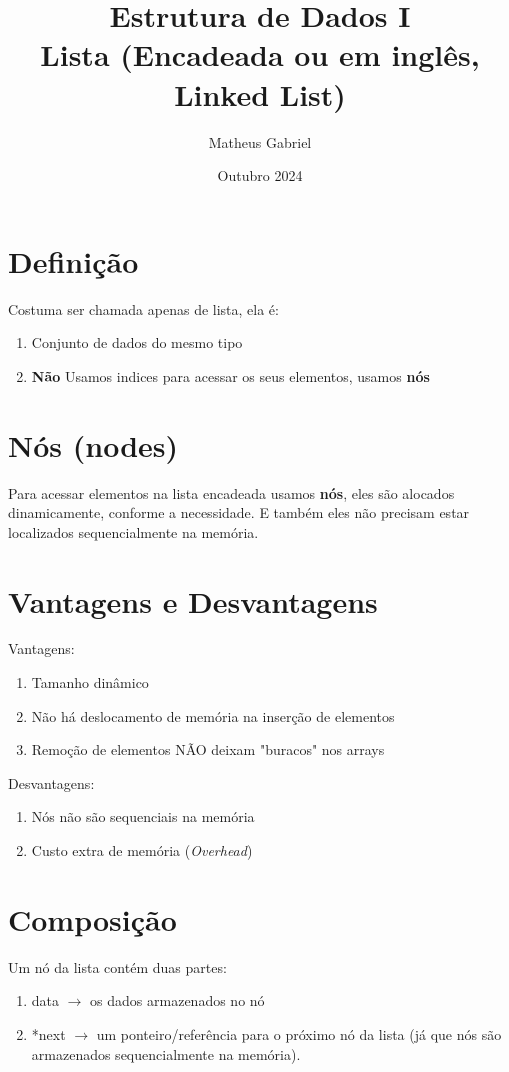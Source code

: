 \documentclass{article}
\title{Estrutura de Dados I
\\ \large Lista (Encadeada ou em inglês, Linked List)}
\author{Matheus Gabriel}
\date{Outubro 2024}
\begin{document}
\maketitle

\section{Definição}

Costuma ser chamada apenas de lista, ela é:
\begin{enumerate}
    \item Conjunto de dados do mesmo tipo
    \item \textbf{Não} Usamos indices para acessar os seus elementos, usamos \textbf{nós}
\end{enumerate}

\section{Nós (nodes)}

Para acessar elementos na lista encadeada usamos \textbf{nós}, eles são alocados dinamicamente, conforme a necessidade. E também eles não precisam estar localizados sequencialmente na memória.

\section{Vantagens e Desvantagens}

Vantagens:
\begin{enumerate}
    \item Tamanho dinâmico
    \item Não há deslocamento de memória na inserção de elementos
    \item Remoção de elementos NÃO deixam "buracos" nos arrays
\end{enumerate}

Desvantagens:
\begin{enumerate}
    \item Nós não são sequenciais na memória
    \item Custo extra de memória (\textit{Overhead})
\end{enumerate}

\section{Composição}
Um nó da lista contém duas partes:
\item 
\begin{enumerate}
    \item data $\rightarrow$ os dados armazenados no nó
    \item *next $\rightarrow$ um ponteiro/referência para o próximo nó da lista (já que nós são armazenados sequencialmente na memória).
\end{enumerate}
\end{document}
